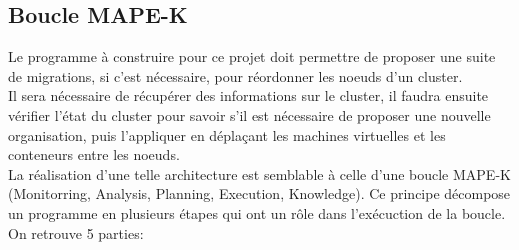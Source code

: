 \documentclass[14pt]{extarticle}
\begin{document}
    \subsection{Boucle MAPE-K}
    Le programme à construire pour ce projet doit permettre de proposer une suite de migrations, si c'est nécessaire, pour réordonner les noeuds d'un cluster.\\
    Il sera nécessaire de récupérer des informations sur le cluster, il faudra ensuite vérifier l'état du cluster pour savoir s'il est nécessaire de proposer une nouvelle organisation, puis l'appliquer en déplaçant les machines virtuelles et les conteneurs entre les noeuds.\\
    La réalisation d'une telle architecture est semblable à celle d'une boucle MAPE-K (Monitorring, Analysis, Planning, Execution, Knowledge). Ce principe décompose un programme en plusieurs étapes qui ont un rôle dans l'exécuction de la boucle.\\
    On retrouve 5 parties:
\end{document}
